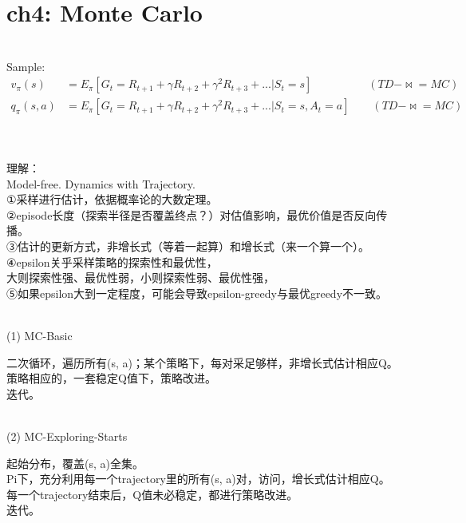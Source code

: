 \documentclass{article}
\begin{document}
\newpage
\section*{ch4: Monte Carlo}


~ \\[3pt]
Sample: 
\begin{align*}
    v_{\pi}(s) 
      &= E_{\pi} \left[ 
         G_{t} = R_{t+1} + \gamma R_{t+2} + \gamma^2 R_{t+3} + ... 
         | S_{t}=s \right] 
         \qquad \qquad \quad (TD-\Join =MC) \\[3pt]
    q_{\pi}(s, a) 
      &= E_{\pi} \left[ 
         G_{t} = R_{t+1} + \gamma R_{t+2} + \gamma^2 R_{t+3} + ... 
         | S_{t}=s, A_{t}=a \right] 
         \qquad (TD-\Join =MC) \\[3pt]
\end{align*}


~ \\[3pt]
\begin{CJK}{UTF8}{gbsn}
    理解： \\[3pt]
    Model-free. Dynamics with Trajectory. \\[3pt]
    ①采样进行估计，依据概率论的大数定理。 \\[3pt]
    ②episode长度（探索半径是否覆盖终点？）对估值影响，最优价值是否反向传播。 \\[3pt]
    ③估计的更新方式，非增长式（等着一起算）和增长式（来一个算一个）。 \\[3pt]
    ④epsilon关乎采样策略的探索性和最优性， \\[3pt]
    大则探索性强、最优性弱，小则探索性弱、最优性强， \\[3pt]
    ⑤如果epsilon大到一定程度，可能会导致epsilon-greedy与最优greedy不一致。 \\[3pt]
\end{CJK}


~ \\[3pt]
(1) MC-Basic 
~ \\[3pt]
\begin{CJK}{UTF8}{gbsn}
    二次循环，遍历所有(s, a)；某个策略下，每对采足够样，非增长式估计相应Q。 \\[3pt]
    策略相应的，一套稳定Q值下，策略改进。 \\[3pt]
    迭代。 \\[3pt]
\end{CJK}


~ \\[3pt]
(2) MC-Exploring-Starts 
~ \\[3pt]
\begin{CJK}{UTF8}{gbsn}
    起始分布，覆盖(s, a)全集。 \\[3pt]
    Pi下，充分利用每一个trajectory里的所有(s, a)对，访问，增长式估计相应Q。 \\[3pt]
    每一个trajectory结束后，Q值未必稳定，都进行策略改进。 \\[3pt]
    迭代。 \\[3pt]
\end{CJK}
\end{document}
